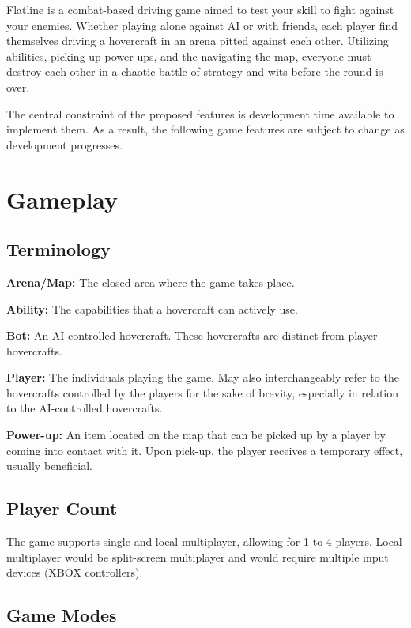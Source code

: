 \documentclass{article}
\newcommand{\name}{Flatline}
\theoremstyle{definition}
\begin{document}
\name{} is a combat-based driving game aimed to test your skill to fight
against your enemies. Whether playing alone against AI or with friends, each
player find themselves driving a hovercraft in an arena pitted against each
other. Utilizing abilities, picking up power-ups, and the navigating the map,
everyone must destroy each other in a chaotic battle of strategy and wits
before the round is over.

The central constraint of the proposed features is development time available
to implement them. As a result, the following game features are subject to
change as development progresses.

\section{Gameplay}

\subsection{Terminology}

\textbf{Arena/Map:} The closed area where the game takes place.

\textbf{Ability:} The capabilities that a hovercraft can actively use.

\textbf{Bot:} An AI-controlled hovercraft. These hovercrafts are distinct from
player hovercrafts.

\textbf{Player:} The individuals playing the game. May also interchangeably
refer to the hovercrafts controlled by the players for the sake of brevity,
especially in relation to the AI-controlled hovercrafts.

\textbf{Power-up:} An item located on the map that can be picked up by a player
by coming into contact with it. Upon pick-up, the player receives a temporary
effect, usually beneficial.

\subsection{Player Count}

The game supports single and local multiplayer, allowing for 1 to 4 players.
Local multiplayer would be split-screen multiplayer and would require multiple
input devices (XBOX controllers).

\subsection{Game Modes}
\end{document}
